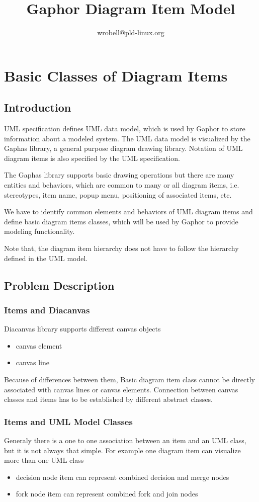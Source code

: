 \documentclass[draft]{book}
\title{Gaphor Diagram Item Model}
\author{wrobell@pld-linux.org}
\begin{document}
\maketitle

\chapter{Basic Classes of Diagram Items}
\section{Introduction}
UML specification defines UML data model, which is used by Gaphor to store
information about a modeled system. The UML data model is visualized by
the Gaphas library, a general purpose diagram drawing library. Notation
of UML diagram items is also specified by the UML specification.

The Gaphas library supports basic drawing operations but there are many
entities and behaviors, which are common to many or all diagram items, i.e.
stereotypes, item name, popup menu, positioning of associated items, etc.

We have to identify common elements and behaviors of UML diagram items
and define basic diagram items classes, which will be used
by Gaphor to provide modeling functionality.

Note that, the diagram item hierarchy does not have to follow the hierarchy
defined in the UML model. 

\section{Problem Description}

\subsection{Items and Diacanvas}\label{gaphor:basic:itemsandcanvas}
Diacanvas library supports different canvas objects
\begin{itemize}
\item canvas element
\item canvas line
\end{itemize}

Because of differences between them, Basic diagram item class cannot be
directly associated with canvas lines or canvas elements. Connection between
canvas classes and items has to be established by different abstract
classes.

\subsection{Items and UML Model Classes}
Generaly there is a one to one association between an item and an UML class,
but it is not always that simple. 
For example one diagram item can visualize more than one UML class
\begin{itemize}
\item decision node item can represent combined decision and merge nodes
\item fork node item can represent combined fork and join nodes 
\end{itemize}
\end{document}
